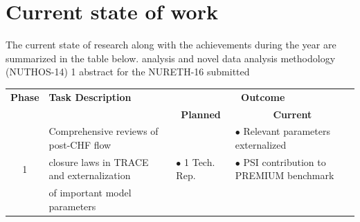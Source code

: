 \documentclass[11pt,titlepage]{article}
\begin{document}
\section{Current state of work}

The current state of research along with the achievements during the year are 
summarized in the table below.
                   analysis and
                               novel data analysis methodology (NUTHOS-14)
                          1 abstract for the NURETH-16 submitted 
                                             
                     
\begin{table}[!h]
    \begin{center}
        \begin{tabular}{  c  p{4cm}  p{2.5cm} p{8cm}}
        \toprule
        \bf{Phase} & \bf{Task Description} & \multicolumn{2}{c}{\bf{Outcome}}  \\
                   &                       & \multicolumn{1}{c}{\bf{Planned}} & \multicolumn{1}{c}{\bf{Current}}       \\\toprule
                     \multirow{5}{*}{1}
                       & Comprehensive reviews of post-CHF flow  & 
                         \multirow{3}{*}{$\bullet$ 1 Tech. Rep.} 
                          & $\bullet$ Relevant parameters externalized \\ 
                       & closure laws in TRACE and externalization & 
                           & $\bullet$ PSI contribution to PREMIUM benchmark  \\
                       & of important model parameters & & \\              
                   \midrule     


\end{tabular}
\end{center}
\end{table}
\end{document}
